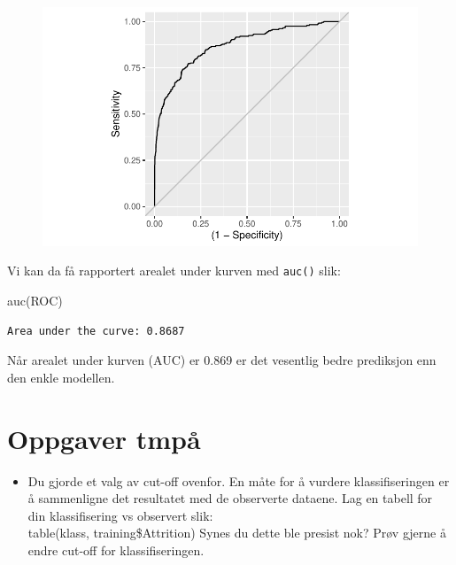 \documentclass[
  letterpaper,
  DIV=11,
  numbers=noendperiod]{scrreprt}
\newenvironment{Shaded}{\begin{snugshade}}{\end{snugshade}}
\newcommand{\FunctionTok}[1]{\textcolor[rgb]{0.28,0.35,0.67}{#1}}
\newcommand{\NormalTok}[1]{\textcolor[rgb]{0.00,0.23,0.31}{#1}}
\providecommand{\tightlist}{%
  \setlength{\itemsep}{0pt}\setlength{\parskip}{0pt}}\usepackage{longtable,booktabs,array}
\theoremstyle{definition}
\theoremstyle{remark}
\begin{document}
\begin{figure}[H]

{\centering \includegraphics{./logistisk_regresjon_files/figure-pdf/unnamed-chunk-17-1.pdf}

}

\end{figure}

Vi kan da få rapportert arealet under kurven med \texttt{auc()} slik:

\begin{Shaded}
\begin{Highlighting}[]
\FunctionTok{auc}\NormalTok{(ROC)}
\end{Highlighting}
\end{Shaded}

\begin{verbatim}
Area under the curve: 0.8687
\end{verbatim}

Når arealet under kurven (AUC) er 0.869 er det vesentlig bedre
prediksjon enn den enkle modellen.

\hypertarget{oppgaver-tmpuxe5}{%
\section{Oppgaver tmpå}\label{oppgaver-tmpuxe5}}

\begin{itemize}
\tightlist
\item
  Du gjorde et valg av cut-off ovenfor. En måte for å vurdere
  klassifiseringen er å sammenligne det resultatet med de observerte
  dataene. Lag en tabell for din klassifisering vs observert slik:\\
  table(klass, training\$Attrition) Synes du dette ble presist nok? Prøv
  gjerne å endre cut-off for klassifiseringen.
\end{itemize}
\end{document}
